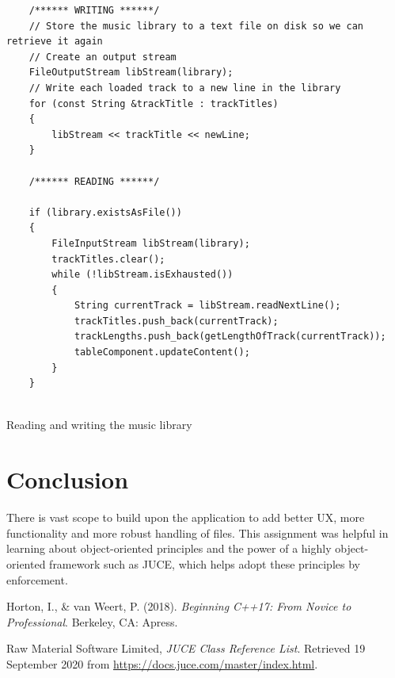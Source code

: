 \begin{listing}
	\begin{verbatim}
	/****** WRITING ******/
	// Store the music library to a text file on disk so we can retrieve it again
	// Create an output stream
	FileOutputStream libStream(library);
	// Write each loaded track to a new line in the library
	for (const String &trackTitle : trackTitles)
	{
		libStream << trackTitle << newLine;
	}

	/****** READING ******/

	if (library.existsAsFile())
	{
		FileInputStream libStream(library);
        trackTitles.clear();
        while (!libStream.isExhausted())
		{
			String currentTrack = libStream.readNextLine();
			trackTitles.push_back(currentTrack);
			trackLengths.push_back(getLengthOfTrack(currentTrack));
			tableComponent.updateContent();
		}
	}
	
	\end{verbatim}
	\caption{Reading and writing the music library}
	\label{IO}
\end{listing}


\section{Conclusion}

There is vast scope to build upon the application to add better UX, more functionality and more robust handling of files. This assignment was helpful in learning about object-oriented principles and the power of a highly object-oriented framework such as JUCE, which helps adopt these principles by enforcement.

\begin{thebibliography}{9}
	Horton, I., \& van Weert, P. (2018). \emph{Beginning C++17: From Novice to Professional}. Berkeley, CA: Apress.
	
	Raw Material Software Limited, \emph{JUCE Class Reference List}. Retrieved 19 September 2020 from \url{https://docs.juce.com/master/index.html}.
	
\end{thebibliography}

